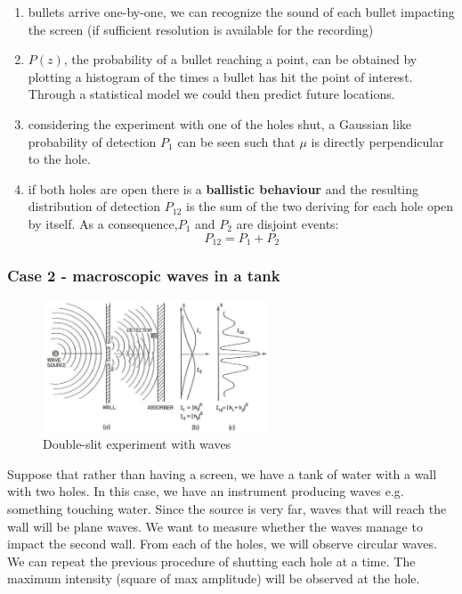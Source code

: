     \begin{multicols}{2}
      \begin{enumerate}
          \item bullets arrive one-by-one, we can recognize the sound of each bullet impacting the screen (if sufficient resolution is available for the recording)
          \item $P(z)$, the probability of a bullet reaching a point, can be obtained by plotting a histogram of the times a bullet has hit the point of interest. Through a statistical model we could then predict future locations.
          \item considering the experiment with one of the holes shut, a Gaussian like probability of detection $P_1$ can be seen such that $\mu$ is directly perpendicular to the hole.
          \item if both holes are open there is a \textbf{ballistic behaviour} and the resulting distribution of detection $P_{12}$ is the sum of the two deriving for each hole open by itself. As a consequence,$P_1$ and $P_2$ are disjoint events: $$P_{12} = P_1+P_2$$
      \end{enumerate}
    \end{multicols}

   \subsubsection{Case 2 - macroscopic waves in a tank}

   \begin{figure}[h!]
     \centering
     \includegraphics[clip, width=0.6\textwidth]{wave_ds.png}
     \caption{\label{fig:wave_ds} Double-slit experiment with waves}
   \end{figure}

     Suppose that rather than having a screen, we have a tank of water with a wall with two holes.
     In this case, we have an instrument producing waves e.g. something touching water.
     Since the source is very far, waves that will reach the wall will be plane waves.
     We want to measure whether the waves manage to impact the second wall.
     From each of the holes, we will observe circular waves.
     We can repeat the previous procedure of shutting each hole at a time.
     The maximum intensity (square of max amplitude) will be observed at the hole.

